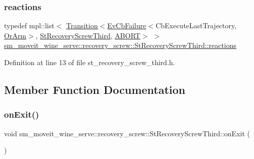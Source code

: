 \subsubsection{\texorpdfstring{reactions}{reactions}}
{\footnotesize\ttfamily typedef mpl\+::list$<$ \hyperlink{classsmacc_1_1Transition}{Transition}$<$\hyperlink{structsmacc_1_1EvCbFailure}{Ev\+Cb\+Failure}$<$Cb\+Execute\+Last\+Trajectory, \hyperlink{classsm__moveit__wine__serve_1_1OrArm}{Or\+Arm}$>$, \hyperlink{structsm__moveit__wine__serve_1_1recovery__screw_1_1StRecoveryScrewThird}{St\+Recovery\+Screw\+Third}, \hyperlink{structsmacc_1_1default__transition__tags_1_1ABORT}{A\+B\+O\+RT}$>$ $>$ \hyperlink{structsm__moveit__wine__serve_1_1recovery__screw_1_1StRecoveryScrewThird_a6d140f74b679e517cdf435af5593e065}{sm\+\_\+moveit\+\_\+wine\+\_\+serve\+::recovery\+\_\+screw\+::\+St\+Recovery\+Screw\+Third\+::reactions}}



Definition at line 13 of file st\+\_\+recovery\+\_\+screw\+\_\+third.\+h.



\subsection{Member Function Documentation}
\mbox{\label{structsm__moveit__wine__serve_1_1recovery__screw_1_1StRecoveryScrewThird_a8e433306f432e3a85c0ffc298df26527}} 
\subsubsection{\texorpdfstring{on\+Exit()}{onExit()}}
{\footnotesize\ttfamily void sm\+\_\+moveit\+\_\+wine\+\_\+serve\+::recovery\+\_\+screw\+::\+St\+Recovery\+Screw\+Third\+::on\+Exit (\begin{DoxyParamCaption}{ }\end{DoxyParamCaption})\hspace{0.3cm}{\ttfamily [inline]}}



